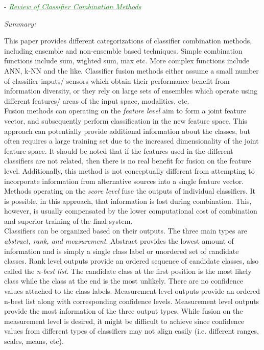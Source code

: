 \documentclass[]{article}
\newcommand{\paperentry}[4]{
            \hangindent=1cm
            \cite{#1} - \href{run:../References/#3}{\textcolor{ForestGreen}{\textit{#2}}}
            
            \noindent            
            \begin{minipage}[t]{0.1\linewidth}\hfill\end{minipage}
            \begin{minipage}[t]{0.8\linewidth}\textcolor{NavyBlue}{{\textit{Summary:}}}#4\end{minipage}
            \vspace{.25cm}
          }
\begin{document}
			
			\paperentry{Tulyakov2008ReviewClassifierCombinationMethods}
			{Review of Classifier Combination Methods}
			{Fusion/Reviews/Tulyakov2008ReviewClassifierCombinationMethods.pdf}
			{}\newline
			This paper provides different categorizations of classifier combination methods, including ensemble and non-ensemble based techniques.  Simple combination functions include sum, wighted sum, max etc.  More complex functions include ANN, k-NN and the like.  Classifier fusion methods either assume a small number of classifier inputs/ sensors which obtain their performance benefit from information diversity, or they rely on large sets of ensembles which operate using different features/ areas of the input space, modalities, etc.  \\
			\noindent
			Fusion methods can operating on the \textit{feature level} aim to form a joint feature vector, and subsequently perform classification in the new feature space.  This approach can potentially provide additional information about the classes, but often requires a large training set due to the increased dimensionality of the joint feature space.  It should be noted that if the features used in the different classifiers are not related, then there is no real benefit for fusion on the feature level. Additionally, this method is not conceptually different from attempting to incorporate information from alternative sources into a single feature vector.\\
			\noindent
			Methods operating on the \textit{score level} fuse the outputs of individual classifiers.  It is possible, in this approach, that information is lost during combination.  This, however, is usually compensated by the lower computational cost of combination and superior training of the final system.  \\
			\noindent
			Classifiers can be organized based on their outputs.  The three main types are \textit{abstract, rank, and measurement}.  Abstract provides the lowest amount of information and is simply a single class label or unordered set of candidate classes.  Rank level outputs provide an ordered sequence of candidate classes, also called the \textit{n-best list}.  The candidate class at the first position is the most likely class while the class at the end is the most unlikely.  There are no confidence values attached to the class labels.  Measurement level outputs provide an ordered n-best  list along with corresponding confidence levels.  Measurement level outputs provide the most information of the three output types.  While fusion on the measurement level is desired, it might be difficult to achieve  since confidence values from different types of classifiers may not align easily (i.e. different ranges, scales, means, etc).\\
\end{document}
